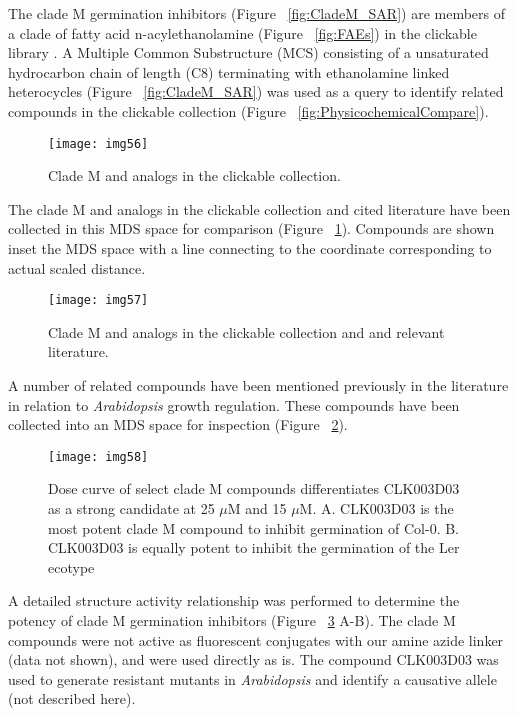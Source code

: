 The clade M germination inhibitors (Figure ~\ref{fig:CladeM_SAR}) are members of a clade of fatty acid n-acylethanolamine (Figure ~\ref{fig:FAEs}) in the clickable library \cite{kilaru2007n,teaster2007n}. A Multiple Common Substructure (MCS) consisting of a unsaturated hydrocarbon chain of length (C8) terminating with ethanolamine linked heterocycles (Figure ~\ref{fig:CladeM_SAR}) was used as a query to identify related compounds in the clickable collection (Figure ~\ref{fig:PhysicochemicalCompare}). 

\begin{figure}
\texttt{[image: img56]}
\caption{Clade M and analogs in the clickable collection.}
\label{fig:CladeMQueryZINC80K}
\end{figure}

The clade M and analogs in the clickable collection and cited literature have been collected in this MDS space for comparison (Figure ~\ref{fig:CladeMQueryZINC80K}). Compounds are shown inset the MDS space with a line connecting to the coordinate corresponding to actual scaled distance.

\begin{figure}
\texttt{[image: img57]}
\caption{Clade M and analogs in the clickable collection and  and relevant literature.}
\label{fig:CladeMQueryLit}
\end{figure}

A number of related compounds have been mentioned previously in the literature in relation to {\it Arabidopsis} growth regulation. These compounds have been collected into an MDS space for inspection (Figure ~\ref{fig:CladeMQueryLit})\cite{kilaru2007n, kim2010fatty}\cite{teaster2007n}. 

\begin{figure}\centering
\texttt{[image: img58]}
\caption{Dose curve of select clade M compounds differentiates CLK003D03 as a strong candidate at 25 $\mu$M and 15 $\mu$M. A. CLK003D03 is the most potent clade M compound to inhibit germination of Col-0. B. CLK003D03 is equally potent to inhibit the germination of the Ler ecotype}
\label{fig:CladeMDoseCurve}
\end{figure}

A detailed structure activity relationship was performed to determine the potency of clade M germination inhibitors (Figure ~\ref{fig:CladeMDoseCurve} A-B). The clade M compounds were not active as fluorescent conjugates with our amine azide linker (data not shown), and were used directly as is. The compound CLK003D03 was used to generate resistant mutants in {\it Arabidopsis} and identify a causative allele (not described here). 

